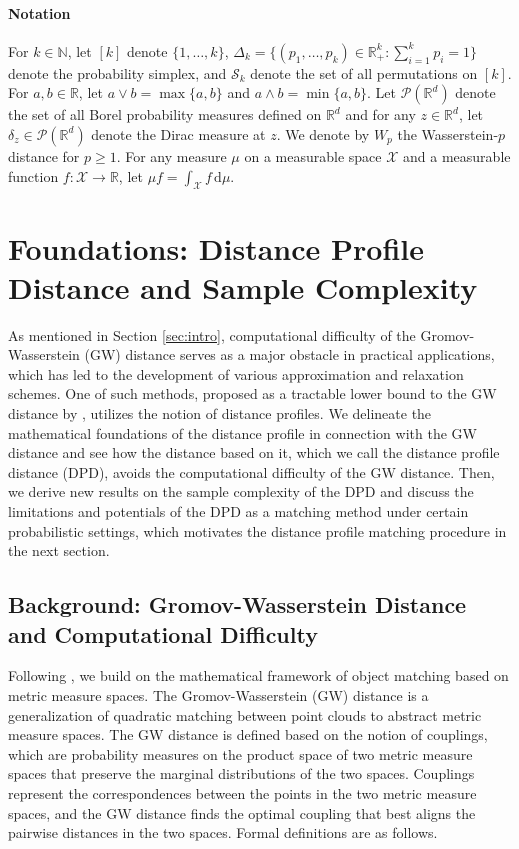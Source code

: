 \documentclass[11pt,letterpaper]{article}
\theoremstyle{definition}
\numberwithin{equation}{section}
\newcommand{\cS}{\mathcal{S}}
\newcommand{\cX}{\mathcal{X}}
\newcommand{\N}{\mathbb{N}}
\newcommand{\R}{\mathbb{R}}
\begin{document}
\paragraph{Notation} For $k \in \N$, let $[k]$ denote $\{1, \ldots, k\}$, $\Delta_k = \{(p_1, \ldots, p_k) \in \R_+^k : \sum_{i = 1}^{k} p_i = 1\}$ denote the probability simplex, and $\cS_k$ denote the set of all permutations on $[k]$. For $a, b \in \R$, let $a \vee b = \max\{a, b\}$ and $a \wedge b = \min\{a, b\}$. Let $\mathscr{P}(\R^d)$ denote the set of all Borel probability measures defined on $\R^d$ and for any $z \in \R^d$, let $\delta_z \in \mathscr{P}(\R^d)$ denote the Dirac measure at $z$. We denote by $W_p$ the Wasserstein-$p$ distance for $p \ge 1$. For any measure $\mu$ on a measurable space $\cX$ and a measurable function $f \colon \cX \to \R$, let $\mu f = \int_{\cX} f \, \mathrm{d} \mu$.


\section{Foundations: Distance Profile Distance and Sample Complexity}
\label{sec:foundations}
As mentioned in Section \ref{sec:intro}, computational difficulty of the Gromov-Wasserstein (GW) distance serves as a major obstacle in practical applications, which has led to the development of various approximation and relaxation schemes. One of such methods, proposed as a tractable lower bound to the GW distance by \cite{memoli2011gromov}, utilizes the notion of distance profiles. We delineate the mathematical foundations of the distance profile in connection with the GW distance and see how the distance based on it, which we call the distance profile distance (DPD), avoids the computational difficulty of the GW distance. Then, we derive new results on the sample complexity of the DPD and discuss the limitations and potentials of the DPD as a matching method under certain probabilistic settings, which motivates the distance profile matching procedure in the next section.


\subsection{Background: Gromov-Wasserstein Distance and Computational Difficulty}
Following \cite{memoli2011gromov}, we build on the mathematical framework of object matching based on metric measure spaces. The Gromov-Wasserstein (GW) distance is a generalization of quadratic matching between point clouds to abstract metric measure spaces. The GW distance is defined based on the notion of couplings, which are probability measures on the product space of two metric measure spaces that preserve the marginal distributions of the two spaces. Couplings represent the correspondences between the points in the two metric measure spaces, and the GW distance finds the optimal coupling that best aligns the pairwise distances in the two spaces. Formal definitions are as follows.
\end{document}
